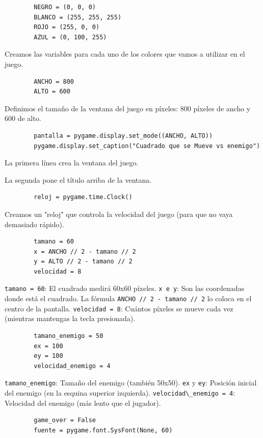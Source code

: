 \documentclass[11.5pt]{article}
\begin{document}
	\begin{verbatim}
		NEGRO = (0, 0, 0)
		BLANCO = (255, 255, 255)
		ROJO = (255, 0, 0)
		AZUL = (0, 100, 255)
	\end{verbatim}
	
	Creamos las variables para cada uno de los colores que vamos a utilizar en el juego.
	
	\begin{verbatim}
		ANCHO = 800
		ALTO = 600
	\end{verbatim}
	
	Definimos el tamaño de la ventana del juego en píxeles: 800 píxeles de ancho y 600 de alto.
	
	\begin{verbatim}
		pantalla = pygame.display.set_mode((ANCHO, ALTO))
		pygame.display.set_caption("Cuadrado que se Mueve vs enemigo")	
	\end{verbatim}
	
	La primera línea crea la ventana del juego.
	
	La segunda pone el título arriba de la ventana.
	
	\begin{verbatim}
		reloj = pygame.time.Clock()
	\end{verbatim}
	
	Creamos un "reloj" que controla la velocidad del juego (para que no vaya demasiado rápido).
	
	\begin{verbatim}
		tamano = 60
		x = ANCHO // 2 - tamano // 2
		y = ALTO // 2 - tamano // 2
		velocidad = 8
	\end{verbatim}
	\verb|tamano = 60|: El cuadrado medirá 60x60 píxeles.
	\verb|x e y|: Son las coordenadas donde está el cuadrado.
	La fórmula \verb|ANCHO // 2 - tamano // 2| lo coloca en el centro de la pantalla.
	\verb|velocidad = 8|: Cuántos píxeles se mueve cada vez (mientras mantengas la tecla presionada).
	
	\begin{verbatim}
		tamano_enemigo = 50
		ex = 100
		ey = 100
		velocidad_enemigo = 4
	\end{verbatim}
	
	\verb|tamano_enemigo|: Tamaño del enemigo (también 50x50).
	\verb|ex| y \verb|ey|: Posición inicial del enemigo (en la esquina superior izquierda).
	\verb|velocidad\_enemigo = 4|: Velocidad del enemigo (más lento que el jugador).
	
	\begin{verbatim}
		game_over = False
		fuente = pygame.font.SysFont(None, 60)
	\end{verbatim}
	
\end{document}
